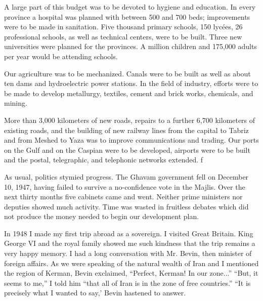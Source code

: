A large part of this budget was to be devoted to hygiene and education. In every province a hospital was planned with between 500 and 700 beds; improvements were to be made in sanitation. Five thousand primary schools, 150 lycées, 26 professional schools, as well as technical centers, were to be built. Three new universities were planned for the provinces. A million children and 175,000 adults per year would be attending schools. 

Our agriculture was to be mechanized. Canals were to be built as well as about ten dams and hydroelectric power stations. In the field of industry, efforts were to be made to develop metallurgy, textiles, cement and brick works, chemicals, and mining. 

More than 3,000 kilometers of new roads, repairs to a further 6,700 kilometers of existing roads, and the building of new railway lines from the capital to Tabriz and from Meshed to Yaza was to improve communications and trading. Our ports on the Gulf and on the Caspian were to be developed, airports were to be built and the postal, telegraphic, and telephonic networks extended. f 

As usual, politics stymied progress. The Ghavam government fell on December 10, 1947, having failed to survive a no-confidence vote in the Majlis. Over the next thirty months five cabinets came and went. Neither prime ministers nor deputies showed much activity. Time was wasted in fruitless debates which did not produce the money needed to begin our development plan. 

In 1948 I made my first trip abroad as a sovereign. I visited Great Britain. King George VI and the royal family showed me such kindness that the trip remains a very happy memory. I had a long conversation with Mr. Bevin, then minister of foreign affairs. As we were speaking of the natural wealth of Iran and I mentioned the region of Kerman, Bevin exclaimed, “Perfect, Kerman! In our zone...” “But, it seems to me,” I told him “that all of Iran is in the zone of free countries.” “It is precisely what I wanted to say,’ Bevin hastened to answer. 

